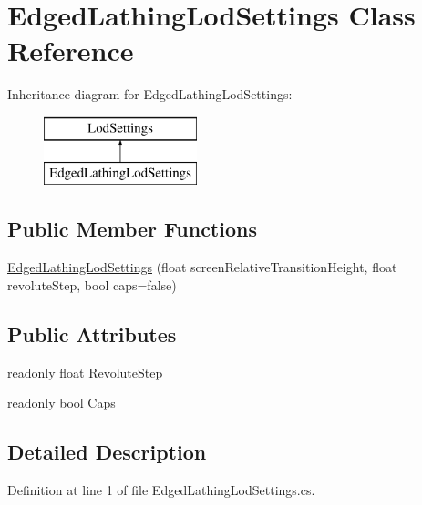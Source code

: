 \hypertarget{class_edged_lathing_lod_settings}{}\section{Edged\+Lathing\+Lod\+Settings Class Reference}
\label{class_edged_lathing_lod_settings}
Inheritance diagram for Edged\+Lathing\+Lod\+Settings\+:\begin{figure}[H]
\begin{center}
\leavevmode
\includegraphics[height=2.000000cm]{class_edged_lathing_lod_settings}
\end{center}
\end{figure}
\subsection*{Public Member Functions}
\begin{DoxyCompactItemize}
\item 
\mbox{\hyperlink{class_edged_lathing_lod_settings_adeb67a639420ab369d37e8bf319b6aee}{Edged\+Lathing\+Lod\+Settings}} (float screen\+Relative\+Transition\+Height, float revolute\+Step, bool caps=false)
\end{DoxyCompactItemize}
\subsection*{Public Attributes}
\begin{DoxyCompactItemize}
\item 
readonly float \mbox{\hyperlink{class_edged_lathing_lod_settings_ae1cffc298db4d3d84cf344014fd6405c}{Revolute\+Step}}
\item 
readonly bool \mbox{\hyperlink{class_edged_lathing_lod_settings_a7223a3d1b90f5edef032a2d23ed48709}{Caps}}
\end{DoxyCompactItemize}


\subsection{Detailed Description}


Definition at line 1 of file Edged\+Lathing\+Lod\+Settings.\+cs.



